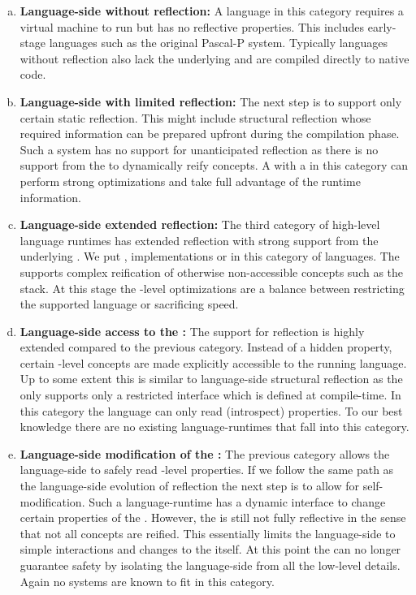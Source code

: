 \begin{enumerate}[a)]
\item \textbf{Language-side without reflection:} A language in this category requires a virtual machine to run but has no reflective properties.
	This includes early-stage languages such as the original Pascal-P system.
	Typically languages without reflection also lack the underlying \VM and are compiled directly to native code.
	
\item \textbf{Language-side with limited reflection:}
	The next step is to support only certain static reflection.
	This might include structural reflection whose required information can be prepared upfront during the compilation phase.
	Such a system has no support for unanticipated reflection as there is no support from the \VM to dynamically reify concepts.
	A \VM with a \JIT in this category can perform strong optimizations and take full advantage of the runtime information.
	
\item \textbf{Language-side extended reflection:}
	The third category of high-level language runtimes has extended reflection with strong support from the underlying \VM.
	We put \PH, \ST implementations or \Self in this category of languages.
	The \VM supports complex reification of otherwise non-accessible concepts such as the stack.
	At this stage the \VM-level optimizations are a balance between restricting the supported language or sacrificing speed.
	
\item \textbf{Language-side access to the \VM:}
	The \VM support for reflection is highly extended compared to the previous category.
	Instead of a hidden property, certain \VM-level concepts are made explicitly accessible to the running language.
	Up to some extent this is similar to language-side structural reflection as the \VM only supports only a restricted interface which is defined at compile-time.
	In this category the language can only read (introspect) \VM properties.
	To our best knowledge there are no existing language-runtimes that fall into this category.

\item \textbf{Language-side modification of the \VM:}
	The previous category allows the language-side to safely read \VM-level properties.
	If we follow the same path as the language-side evolution of reflection the next step is to allow for self-modification.
	Such a language-runtime has a dynamic interface to change certain properties of the \VM.
	However, the \VM is still not fully reflective in the sense that not all \VM concepts are reified.
	This essentially limits the language-side to simple interactions and changes to the \VM itself.
	At this point the \VM can no longer guarantee safety by isolating the language-side from all the low-level details.
	Again no systems are known to fit in this category.
	

\end{enumerate}
